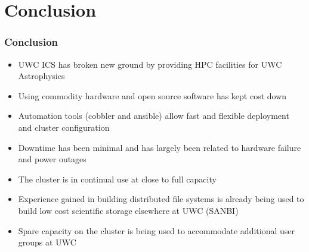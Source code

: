 \documentclass[handout]{beamer}
\begin{document}
\section{Conclusion}
\begin{frame}
\frametitle{Conclusion}
\begin{itemize}
\item UWC ICS has broken new ground by providing HPC facilities for UWC Astrophysics
\item Using commodity hardware and open source software has kept cost down
\item Automation tools (cobbler and ansible) allow fast and flexible deployment and cluster configuration
\item Downtime has been minimal and has largely been related to hardware failure and power outages
\item The cluster is in continual use at close to full capacity
\item Experience gained in building distributed file systems is already being used to build low cost scientific storage elsewhere at UWC  (SANBI)
\item Spare capacity on the cluster is being used to accommodate additional user groups at UWC
\end{itemize}
\end{frame}
\end{document}
